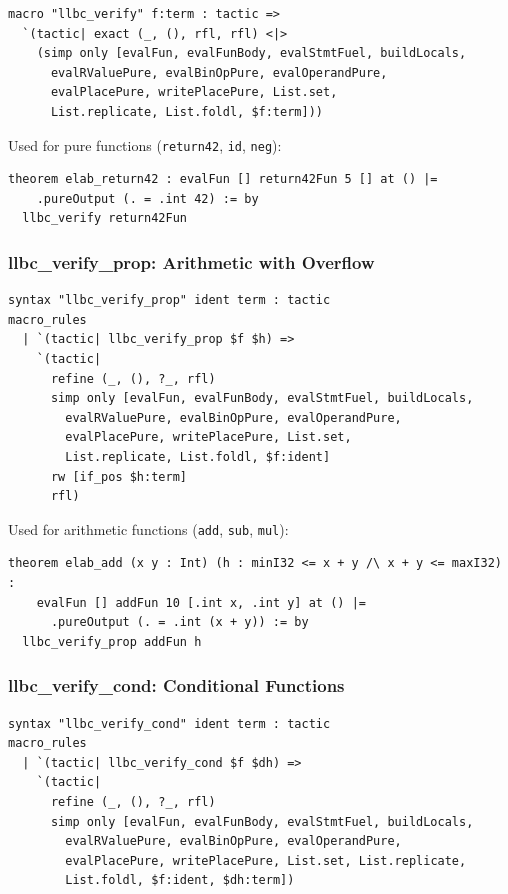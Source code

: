 \begin{lstlisting}[caption={llbc\_verify macro.},label={lst:lv}]
macro "llbc_verify" f:term : tactic =>
  `(tactic| exact (_, (), rfl, rfl) <|>
    (simp only [evalFun, evalFunBody, evalStmtFuel, buildLocals,
      evalRValuePure, evalBinOpPure, evalOperandPure,
      evalPlacePure, writePlacePure, List.set,
      List.replicate, List.foldl, $f:term]))
\end{lstlisting}

Used for pure functions (\texttt{return42}, \texttt{id}, \texttt{neg}):

\begin{lstlisting}
theorem elab_return42 : evalFun [] return42Fun 5 [] at () |=
    .pureOutput (. = .int 42) := by
  llbc_verify return42Fun
\end{lstlisting}

\subsubsection{llbc\_verify\_prop: Arithmetic with Overflow}

\begin{lstlisting}[caption={llbc\_verify\_prop macro.},label={lst:lvp}]
syntax "llbc_verify_prop" ident term : tactic
macro_rules
  | `(tactic| llbc_verify_prop $f $h) =>
    `(tactic|
      refine (_, (), ?_, rfl)
      simp only [evalFun, evalFunBody, evalStmtFuel, buildLocals,
        evalRValuePure, evalBinOpPure, evalOperandPure,
        evalPlacePure, writePlacePure, List.set,
        List.replicate, List.foldl, $f:ident]
      rw [if_pos $h:term]
      rfl)
\end{lstlisting}

Used for arithmetic functions (\texttt{add}, \texttt{sub}, \texttt{mul}):

\begin{lstlisting}
theorem elab_add (x y : Int) (h : minI32 <= x + y /\ x + y <= maxI32) :
    evalFun [] addFun 10 [.int x, .int y] at () |=
      .pureOutput (. = .int (x + y)) := by
  llbc_verify_prop addFun h
\end{lstlisting}

\subsubsection{llbc\_verify\_cond: Conditional Functions}

\begin{lstlisting}[caption={llbc\_verify\_cond macro.},label={lst:lvc}]
syntax "llbc_verify_cond" ident term : tactic
macro_rules
  | `(tactic| llbc_verify_cond $f $dh) =>
    `(tactic|
      refine (_, (), ?_, rfl)
      simp only [evalFun, evalFunBody, evalStmtFuel, buildLocals,
        evalRValuePure, evalBinOpPure, evalOperandPure,
        evalPlacePure, writePlacePure, List.set, List.replicate,
        List.foldl, $f:ident, $dh:term])
\end{lstlisting}

